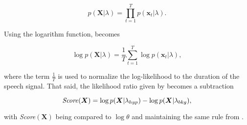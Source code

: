 \begin{equation}
    p(\boldsymbol{X}|\lambda) = \prod_{t=1}^T p(\boldsymbol{x}_t|\lambda).
    \label{eq:likelihood-prod}
\end{equation}

\noindent Using the logarithm function,  becomes

\begin{equation}
    \log p(\boldsymbol{X}|\lambda) = \frac{1}{T} \sum_{t=1}^T \log p(\boldsymbol{x}_t|\lambda),
    \label{eq:log-likelihood-sum}
\end{equation}

\noindent where the term $\frac{1}{T}$ is used to normalize the log-likelihood to the duration of the speech signal. That said, the likelihood ratio given by  becomes a subtraction

\begin{equation}
    \text{\emph{Score}}(\boldsymbol{X}) = \log p(\boldsymbol{X}|\lambda_{hyp}) - \log p(\boldsymbol{X}|\lambda_{bkg}),
    \label{eq:score_of_X}
\end{equation}

\noindent with \emph{Score}$(\boldsymbol{X})$ being compared to $\log\theta$ and maintaining the same rule from .